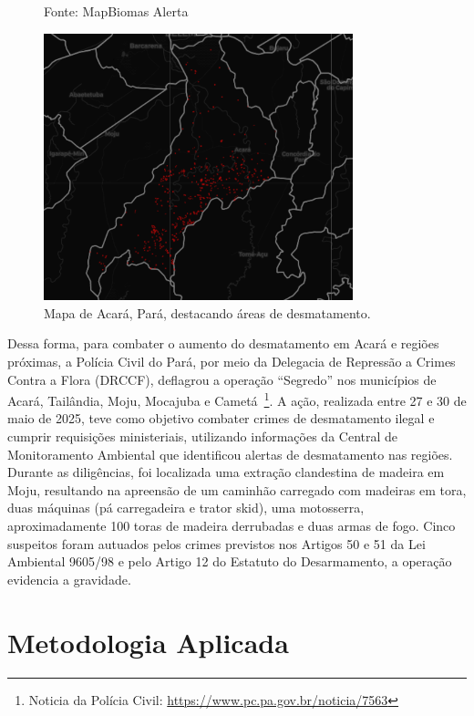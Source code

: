 \documentclass[12pt, a4paper, onecolumn, notitlepage]{article}
\begin{document}
    \begin{figure}[htbp]
        \centering
        \caption*{Fonte: MapBiomas Alerta}
        \includegraphics[width=0.8\textwidth]{figures/mapa_acara.png}
        \caption{Mapa de Acará, Pará, destacando áreas de desmatamento.}
        \label{fig:mapa_acara}
    \end{figure}

    Dessa forma, para combater o aumento do desmatamento em Acará e regiões próximas, a Polícia Civil do Pará, por meio da Delegacia de Repressão a Crimes Contra a Flora (DRCCF), deflagrou a operação ``Segredo'' nos municípios de Acará, Tailândia, Moju, Mocajuba e Cametá~\footnote{Noticia da Polícia Civil: \url{https://www.pc.pa.gov.br/noticia/7563}}. A ação, realizada entre 27 e 30 de maio de 2025, teve como objetivo combater crimes de desmatamento ilegal e cumprir requisições ministeriais, utilizando informações da Central de Monitoramento Ambiental que identificou alertas de desmatamento nas regiões. Durante as diligências, foi localizada uma extração clandestina de madeira em Moju, resultando na apreensão de um caminhão carregado com madeiras em tora, duas máquinas (pá carregadeira e trator skid), uma motosserra, aproximadamente 100 toras de madeira derrubadas e duas armas de fogo. Cinco suspeitos foram autuados pelos crimes previstos nos Artigos 50 e 51 da Lei Ambiental 9605/98 e pelo Artigo 12 do Estatuto do Desarmamento, a operação evidencia a gravidade.

    \section{Metodologia Aplicada}
\end{document}
